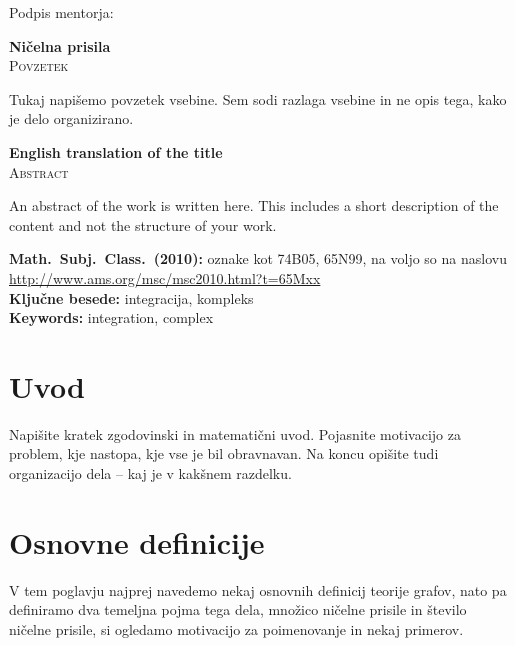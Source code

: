 \documentclass[12pt,a4paper,twoside]{article}
\newcommand{\naslovdela}{Ničelna prisila}
\newcommand{\kljucnebesede}{integracija\sep kompleks} %
\newcommand{\keywords}{integration\sep complex} %
\newcommand{\sep}{, }  %
\theoremstyle{definition} %
\theoremstyle{plain} %
\numberwithin{equation}{section}  %
\begin{document}
\vspace{2cm}
\hspace*{\fill} Podpis mentorja: \phantom{prostor za podpis}


\cleardoublepage
{}

\begin{center}
\textbf{\naslovdela} \\[3mm]
\textsc{Povzetek} \\[2mm]
\end{center}
Tukaj napišemo povzetek vsebine. Sem sodi razlaga vsebine in ne opis tega, kako je delo
organizirano.

\vfill
\begin{center}
\textbf{English translation of the title} \\[3mm] %
\textsc{Abstract}\\[2mm]
\end{center}

An abstract of the work is written here. This includes a short description of
the content and not the structure of your work.

\vfill\noindent
\textbf{Math.~Subj.~Class.~(2010):} oznake kot 74B05, 65N99, na voljo so na naslovu
\url{http://www.ams.org/msc/msc2010.html?t=65Mxx} \\[1mm]
\textbf{Ključne besede:} \kljucnebesede \\[1mm]
\textbf{Keywords:} \keywords

\cleardoublepage

\setcounter{page}{1}    %

\section{Uvod}
Napišite kratek zgodovinski in matematični uvod.  Pojasnite motivacijo za problem, kje
nastopa, kje vse je bil obravnavan. Na koncu opišite tudi organizacijo dela -- kaj je v kakšnem
razdelku.

\section{Osnovne definicije}
V tem poglavju najprej navedemo nekaj osnovnih definicij teorije grafov, nato pa definiramo dva temeljna pojma tega dela, množico ničelne prisile in število ničelne prisile, si ogledamo motivacijo za poimenovanje in nekaj primerov.
\end{document}
